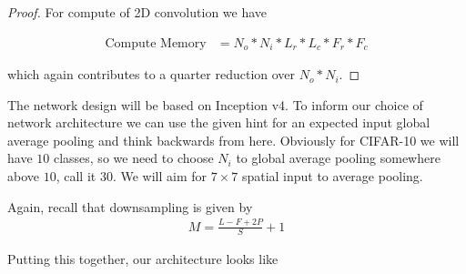 \documentclass[11pt]{article}
\begin{document}
\begin{enumerate}[(a)]
\begin{proof}
		For compute of 2D convolution we have

		\begin{align}
			\text{Compute Memory} &= N_o * N_i * L_r * L_c * F_r * F_c
		\end{align}

		which again contributes to a quarter reduction over $N_o * N_i$.


	\end{proof}

\end{enumerate}
\begin{solution}
	The network design will be based on Inception v4. To inform our choice
	of network architecture we can use the given hint for an expected input
	global average pooling and think backwards from here. Obviously for
	CIFAR-10 we will have $10$ classes, so we need to choose $N_i$ to global
	average pooling somewhere above $10$, call it $30$. We will aim for $7
	\times 7$ spatial input to average pooling.
	\newline

	\noindent
	Again, recall that downsampling is given by
	\begin{align}
		M = \frac{L - F + 2P}{S}+1
	\end{align}

	\noindent
	Putting this together, our architecture looks like

\begin{figure}[H]
	\noindent{}
\end{figure}
\end{solution}
\end{document}
